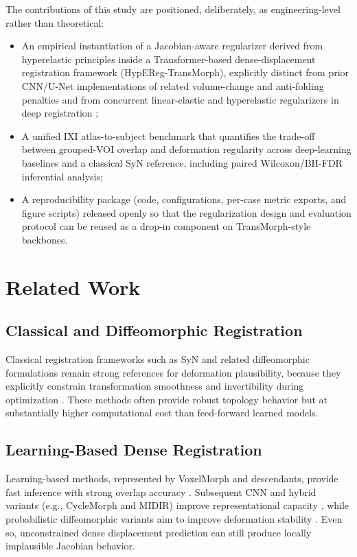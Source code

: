 \documentclass[jimaging,article,submit,pdftex,moreauthors]{Definitions/mdpi}
\begin{document}
The contributions of this study are positioned, deliberately, as engineering-level rather than theoretical:
\begin{itemize}
\item An empirical instantiation of a Jacobian-aware regularizer derived from hyperelastic principles inside a Transformer-based dense-displacement registration framework (HypEReg-TransMorph), explicitly distinct from prior CNN/U-Net implementations of related volume-change and anti-folding penalties \cite{mok2020fast,hering2021lung} and from concurrent linear-elastic and hyperelastic regularizers in deep registration \cite{zou2023conformal,elasticmorph2025};
\item A unified IXI atlas-to-subject benchmark that quantifies the trade-off between grouped-VOI overlap and deformation regularity across deep-learning baselines and a classical SyN reference, including paired Wilcoxon/BH-FDR inferential analysis;
\item A reproducibility package (code, configurations, per-case metric exports, and figure scripts) released openly so that the regularization design and evaluation protocol can be reused as a drop-in component on TransMorph-style backbones.
\end{itemize}

\section{Related Work}

\subsection{Classical and Diffeomorphic Registration}
Classical registration frameworks such as SyN and related diffeomorphic formulations remain strong references for deformation plausibility, because they explicitly constrain transformation smoothness and invertibility during optimization \cite{avants2008ants,rueckert1999nonrigid,ashburner1999morphometry}. These methods often provide robust topology behavior but at substantially higher computational cost than feed-forward learned models.

\subsection{Learning-Based Dense Registration}
Learning-based methods, represented by VoxelMorph and descendants, provide fast inference with strong overlap accuracy \cite{balakrishnan2019voxelmorph}. Subsequent CNN and hybrid variants (e.g., CycleMorph and MIDIR) improve representational capacity \cite{kim2021cyclemorph}, while probabilistic diffeomorphic variants aim to improve deformation stability \cite{dalca2019probreg}. Even so, unconstrained dense displacement prediction can still produce locally implausible Jacobian behavior.
\end{document}
